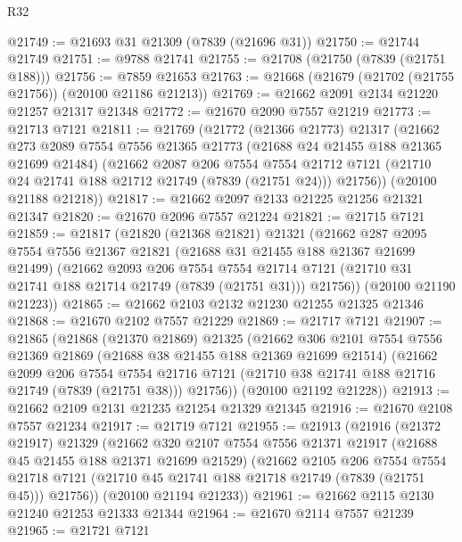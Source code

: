 \begin{lexlean}{R32}
\begin{coremodule}
@21749 := @21693 @31 @21309 (@7839 (@21696 @31))
@21750 := @21744 @21749
@21751 := @9788 @21741
@21755 := @21708 (@21750 (@7839 (@21751 @188)))
@21756 := @7859 @21653
@21763 := @21668 (@21679 (@21702 (@21755 @21756)) (@20100 @21186 @21213))
@21769 := @21662 @2091 @2134 @21220 @21257 @21317 @21348
@21772 := @21670 @2090 @7557 @21219
@21773 := @21713 @7121
@21811 := @21769
    (@21772
      (@21366 @21773)
      @21317
      (@21662
        @273
        @2089
        @7554
        @7556
        @21365
        @21773
        (@21688 @24 @21455 @188 @21365 @21699 @21484)
        (@21662
          @2087
          @206
          @7554
          @7554
          @21712
          @7121
          (@21710 @24 @21741 @188 @21712 @21749 (@7839 (@21751 @24)))
          @21756))
      (@20100 @21188 @21218))
@21817 := @21662 @2097 @2133 @21225 @21256 @21321 @21347
@21820 := @21670 @2096 @7557 @21224
@21821 := @21715 @7121
@21859 := @21817
    (@21820
      (@21368 @21821)
      @21321
      (@21662
        @287
        @2095
        @7554
        @7556
        @21367
        @21821
        (@21688 @31 @21455 @188 @21367 @21699 @21499)
        (@21662
          @2093
          @206
          @7554
          @7554
          @21714
          @7121
          (@21710 @31 @21741 @188 @21714 @21749 (@7839 (@21751 @31)))
          @21756))
      (@20100 @21190 @21223))
@21865 := @21662 @2103 @2132 @21230 @21255 @21325 @21346
@21868 := @21670 @2102 @7557 @21229
@21869 := @21717 @7121
@21907 := @21865
    (@21868
      (@21370 @21869)
      @21325
      (@21662
        @306
        @2101
        @7554
        @7556
        @21369
        @21869
        (@21688 @38 @21455 @188 @21369 @21699 @21514)
        (@21662
          @2099
          @206
          @7554
          @7554
          @21716
          @7121
          (@21710 @38 @21741 @188 @21716 @21749 (@7839 (@21751 @38)))
          @21756))
      (@20100 @21192 @21228))
@21913 := @21662 @2109 @2131 @21235 @21254 @21329 @21345
@21916 := @21670 @2108 @7557 @21234
@21917 := @21719 @7121
@21955 := @21913
    (@21916
      (@21372 @21917)
      @21329
      (@21662
        @320
        @2107
        @7554
        @7556
        @21371
        @21917
        (@21688 @45 @21455 @188 @21371 @21699 @21529)
        (@21662
          @2105
          @206
          @7554
          @7554
          @21718
          @7121
          (@21710 @45 @21741 @188 @21718 @21749 (@7839 (@21751 @45)))
          @21756))
      (@20100 @21194 @21233))
@21961 := @21662 @2115 @2130 @21240 @21253 @21333 @21344
@21964 := @21670 @2114 @7557 @21239
@21965 := @21721 @7121

\end{coremodule}
\end{lexlean}
